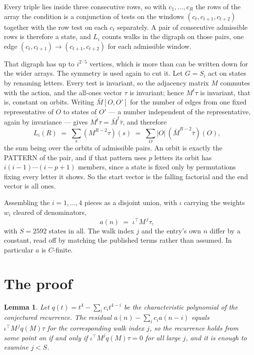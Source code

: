 \documentclass[11pt,a4paper]{article}
\theoremstyle{plain}
\newtheorem{lemma}[theorem]{Lemma}
\theoremstyle{definition}
\begin{document}
Every triple lies inside three consecutive rows, so with $c_1,\dots,c_R$ the rows of the array
the condition is a conjunction of tests on the windows $(c_{t},c_{t+1},c_{t+2})$ together
with the row test on each $c_t$ separately. A pair of consecutive admissible rows is therefore
a state, and $L_i$ counts walks in the digraph on those pairs, one edge $(c_t,c_{t+1})\to
(c_{t+1},c_{t+2})$ for each admissible window.

That digraph has up to $i^{2\cdot5}$ vertices, which is more than can be written down for
the wider arrays. The symmetry is used again to cut it. Let $G=S_i$ act on states by renaming
letters. Every test is invariant, so the adjacency matrix $M$ commutes with the action, and the
all-ones vector $\tau$ is invariant; hence $M^{t}\tau$ is invariant, that is, constant on
orbits. Writing $\bar M[O,O']$ for the number of edges from one fixed representative of $O$ to
states of $O'$ --- a number independent of the representative, again by invariance --- gives
$\overline{M^{t}\tau}=\bar M^{t}\bar\tau$, and therefore
\[
L_i(R)\;=\;\sum_{s}(M^{R-2}\tau)(s)\;=\;\sum_{O}|O|\,(\bar M^{R-2}\bar\tau)(O),
\]
the sum being over the orbits of admissible pairs. An orbit is exactly the PATTERN of the pair,
and if that pattern uses $p$ letters its orbit has $i(i-1)\cdots(i-p+1)$ members, since a state
is fixed only by permutations fixing every letter it shows. So the start vector is the falling
factorial and the end vector is all ones.

Assembling the $i=1,\dots,4$ pieces as a disjoint union, with $\iota$ carrying the weights
$w_i$ cleared of denominators,
\[
a(n)\;=\;\iota^{\!\top}M^{\,j}\tau ,
\]
with $S=2592$ states in all. The walk index $j$ and the entry's own $n$ differ by a constant,
read off by matching the published terms rather than assumed. In particular $a$ is $C$-finite.

\section{The proof}

\begin{lemma}\label{lem:crit}
Let $q(t)=t^{4}-\sum_i c_it^{4-i}$ be the characteristic polynomial of the
conjectured recurrence. The residual $a(n)-\sum_ic_ia(n-i)$ equals
$\iota^{\!\top}M^{\,j}q(M)\tau$ for the corresponding walk index $j$, so the recurrence
holds from some point on if and only if $\iota^{\!\top}M^{j}q(M)\tau=0$ for all large $j$,
and it is enough to examine $j<S$.
\end{lemma}
\end{document}
